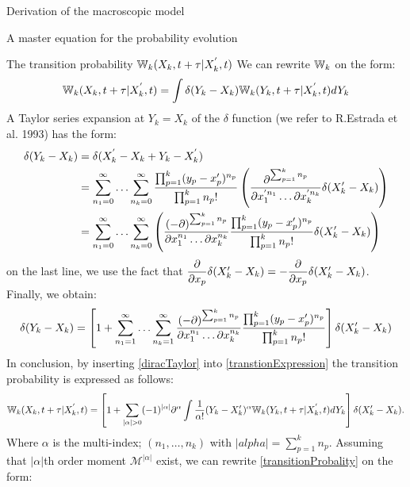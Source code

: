 \begin{paragraph}{Derivation of the macroscopic model}
\begin{paragraph}{A master equation for the probability evolution}
\begin{paragraph}{The transition probability ${\mathbb{W}}_k(X_k, t+\tau \vert X_k^{'},t)$}
We can rewrite ${\mathbb{W}}_k$ on the form: 
\begin{equation}
\label{transtionExpression}
{\mathbb{W}}_k(X_k, t+\tau \vert X_k^{'},t) = \int \delta (Y_k - X_k) {\mathbb{W}}_k(Y_k, t+\tau \vert X_k^{'},t) d Y_k
\end{equation}
A Taylor series expansion at $Y_k = X_k$ of the $\delta$ function (we refer to R.Estrada et al. 1993) has the form:  
\begin{align*}
\delta(Y_k - X_k) &= \delta(X^{'}_k -X_k + Y_k - X^{'}_k) \nonumber \\
 & = \sum_{n_1=0}^{\infty} \ldots \sum_{n_k=0}^{\infty} \dfrac{\prod_{p=1}^{k} (y_p - x'_p)^{n_p}}{\prod_{p=1}^{k}n_p!} \left(\dfrac{{\partial}^{\sum_{p=1}^{k}n_p}}{{\partial} x_1^{' n_{1}} \ldots {\partial} x_k^{' n_{k}}} \delta(X'_k - X_k) \right) \nonumber \\
 & = \sum_{n_1=0}^{\infty} \ldots \sum_{n_k=0}^{\infty}  \left( \dfrac{(-{\partial})^{\sum_{p=1}^{k}n_p}}{{\partial} x_1^{n_{1}} \ldots {\partial} x_k^{n_{k}}} \dfrac{\prod_{p=1}^{k} (y_p - x'_p)^{n_p}}{\prod_{p=1}^{k}n_p!} \delta(X'_k - X_k) \right) 
\end{align*} 
on the last line, we use the fact that $\dfrac{{\partial}}{{\partial} x_p} \delta(X'_k - X_k) = -\dfrac{{\partial}}{{\partial} x_p} \delta (X'_k - X_k) $. Finally, we obtain: 
\begin{equation}
\label{diracTaylor}
\delta(Y_k - X_k) = \left[1 + \sum_{n_1=1}^{\infty} \ldots \sum_{n_k=1}^{\infty}   \dfrac{(-{\partial})^{\sum_{p=1}^{k}n_p}}{{\partial} x_1^{n_{1}} \ldots {\partial} x_k^{n_{k}}} \dfrac{\prod_{p=1}^{k} (y_p - x'_p)^{n_p}}{\prod_{p=1}^{k}n_p!} \right] \delta(X'_k - X_k)
\end{equation}
In conclusion, by inserting \eqref{diracTaylor} into  \eqref{transtionExpression} the transition probability is expressed as follows:
\begin{equation}
\label{transitionProbality}
{\mathbb{W}}_k(X_k, t+\tau \vert X_k^{'},t) = \left[1 + \sum_{\vert \alpha \vert >0} (-1)^{\vert \alpha \vert} {\partial}^{\alpha} \int \dfrac{1}{\alpha !}(Y_k - X'_k)^{\alpha} {\mathbb{W}}_k(Y_k, t+\tau \vert X_k^{'},t)dY_k \right] \delta(X'_k - X_k).
\end{equation}
Where $\alpha$ is the multi-index; $(n_1, \ldots, n_k)$ with $\vert alpha \vert = \sum_{p=1}^{k}n_p $.
Assuming that $\vert \alpha \vert$th order moment $\mathcal{M}^{\vert \alpha \vert}$ exist, we can rewrite \eqref{transitionProbality} on the form: 
\begin{equation}
\label{transitionProbalityWithMoment}

\end{equation}
\end{paragraph}
\end{paragraph}
\end{paragraph}

